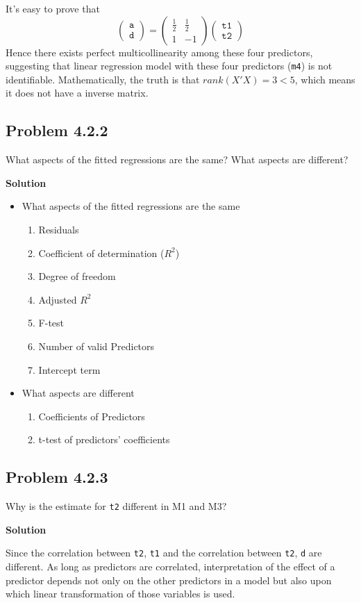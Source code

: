 \documentclass[12pt,oneside,a4paper]{article}\usepackage[]{graphicx}\usepackage[]{xcolor}
\newcommand{\subproblem}[1]
{
    \subsection*{Problem {#1}}
}
\newcommand{\solution}
{
    \vspace{15pt}
    \noindent\ignorespaces\textbf{\large Solution}
}
\newcommand{\m}[1]{\texttt{{#1}}}
\begin{document}
It's easy to prove that 
$$\begin{pmatrix}
  \m{a} \\
  \m{d} 
 \end{pmatrix} = 
 \begin{pmatrix}
  \frac{1}{2} & \frac{1}{2}\\
  1 & -1  
 \end{pmatrix}
 \begin{pmatrix}
  \m{t1}\\
  \m{t2} 
 \end{pmatrix}
$$
Hence there exists perfect multicollinearity among these four predictors, suggesting that linear regression model with these four predictors (\m{m4}) is not identifiable. Mathematically, the truth is that $rank(X'X) = 3 < 5$, which means it does not have a inverse matrix.

\subproblem{4.2.2}
What aspects of the fitted regressions are the same? What aspects are different?

\solution

\begin{itemize}
    \item What aspects of the fitted regressions are the same
    \begin{enumerate}
        \item Residuals
        \item Coefficient of determination ($R^2$)
        \item Degree of freedom
        \item Adjusted $R^2$
        \item F-test
        \item Number of valid Predictors
        \item Intercept term
    \end{enumerate}
    \item What aspects are different
    \begin{enumerate}
        \item Coefficients of Predictors
        \item t-test of predictors' coefficients       
    \end{enumerate}
\end{itemize}

\subproblem{4.2.3}
Why is the estimate for \m{t2} different in M1 and M3?

\solution

Since the correlation between \m{t2}, \m{t1} and the correlation between \m{t2}, \m{d} are different. As long as predictors are correlated, interpretation of the effect of a predictor depends not only on the other predictors in a model but also upon which linear transformation of those variables is used.
\end{document}
